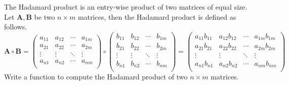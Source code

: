 \begin{exer}
The Hadamard product is an entry-wise product of two matrices 
of equal size.  Let $\mathbf{A}, \mathbf{B}$ be two $n \times m$ 
matrices, then the Hadamard product is defined as follows.
$$\mathbf{A} \circ \mathbf{B} = \begin{pmatrix} a_{11} & a_{12} & \cdots & a_{1m} \\
 a_{21} & a_{22} & \cdots & a_{2m} \\
\vdots & \vdots & \ddots & \vdots \\
 a_{n1} & a_{n2} & \cdots & a_{nm} \\
\end{pmatrix}\circ\begin{pmatrix}
 b_{11} & b_{12} & \cdots & b_{1m} \\
 b_{21} & b_{22} & \cdots & b_{2m} \\
\vdots & \vdots & \ddots & \vdots \\
 b_{n1} & b_{n2} & \cdots & b_{nm} \\
\end{pmatrix} =\begin{pmatrix}
 a_{11}b_{11} & a_{12}b_{12} & \cdots & a_{1m}b_{1m} \\
 a_{21}b_{21} & a_{22}b_{22} & \cdots & a_{2m}b_{2m} \\
\vdots & \vdots & \ddots & \vdots \\
 a_{n1}b_{n1} & a_{n2}b_{n2} & \cdots & a_{nm}b_{nm} \\
\end{pmatrix}$$
Write a function to compute the Hadamard product of two 
$n \times m$ matrices.
\end{exer}

